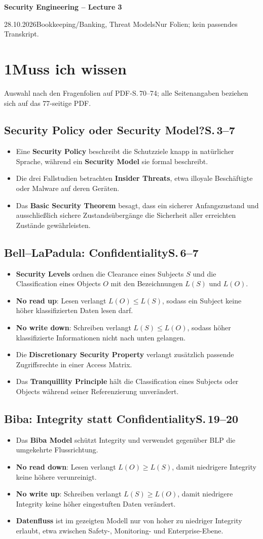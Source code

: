 \documentclass[11pt,a4paper]{article}
\newcommand{\block}[2]{\subsection*{#1\hfill{\normalfont\small #2}}}
\begin{document}
\raggedright
\setlength{\emergencystretch}{2em}
{\Large\bfseries Security Engineering -- Lecture 3}\par
{\small 28.10.2026\quad Bookkeeping/Banking, Threat Models\quad Nur Folien; kein passendes Transkript.}

\section*{1\quad Muss ich wissen}
{\small Auswahl nach den Fragenfolien auf PDF-S.\,70--74; alle Seitenangaben beziehen sich auf das 77-seitige PDF.}

\block{Security Policy oder Security Model?}{S.\,3--7}
\begin{itemize}
\item Eine \textbf{Security Policy} beschreibt die Schutzziele knapp in natürlicher Sprache, während ein \textbf{Security Model} sie formal beschreibt.
\item Die drei Fallstudien betrachten \textbf{Insider Threats}, etwa illoyale Beschäftigte oder Malware auf deren Geräten.
\item Das \textbf{Basic Security Theorem} besagt, dass ein sicherer Anfangszustand und ausschließlich sichere Zustandsübergänge die Sicherheit aller erreichten Zustände gewährleisten.
\end{itemize}

\block{Bell--LaPadula: Confidentiality}{S.\,6--7}
\begin{itemize}
\item \textbf{Security Levels} ordnen die Clearance eines Subjects $S$ und die Classification eines Objects $O$ mit den Bezeichnungen $L(S)$ und $L(O)$.
\item \textbf{No read up}: Lesen verlangt $L(O)\leq L(S)$, sodass ein Subject keine höher klassifizierten Daten lesen darf.
\item \textbf{No write down}: Schreiben verlangt $L(S)\leq L(O)$, sodass höher klassifizierte Informationen nicht nach unten gelangen.
\item Die \textbf{Discretionary Security Property} verlangt zusätzlich passende Zugriffsrechte in einer Access Matrix.
\item Das \textbf{Tranquillity Principle} hält die Classification eines Subjects oder Objects während seiner Referenzierung unverändert.
\end{itemize}

\block{Biba: Integrity statt Confidentiality}{S.\,19--20}
\begin{itemize}
\item Das \textbf{Biba Model} schützt Integrity und verwendet gegenüber BLP die umgekehrte Flussrichtung.
\item \textbf{No read down}: Lesen verlangt $L(O)\geq L(S)$, damit niedrigere Integrity keine höhere verunreinigt.
\item \textbf{No write up}: Schreiben verlangt $L(S)\geq L(O)$, damit niedrigere Integrity keine höher eingestuften Daten verändert.
\item \textbf{Datenfluss} ist im gezeigten Modell nur von hoher zu niedriger Integrity erlaubt, etwa zwischen Safety-, Monitoring- und Enterprise-Ebene.
\end{itemize}
\end{document}
